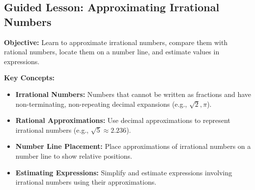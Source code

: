 \documentclass[12pt]{article}
\title{}
\date{}
\begin{document}
\subsection*{Guided Lesson: Approximating Irrational Numbers}
\onehalfspacing

\begin{tcolorbox}[colframe=black!40, colback=gray!5, 
coltitle=black, colbacktitle=black!20, fonttitle=\bfseries\Large, 
title=Learning Objective, halign title=center, left=5pt, right=5pt, top=5pt, bottom=15pt]
\textbf{Objective:} Learn to approximate irrational numbers, compare them with rational numbers, locate them on a number line, and estimate values in expressions.
\end{tcolorbox}

\begin{tcolorbox}[colframe=black!60, colback=white, 
coltitle=black, colbacktitle=black!15, fonttitle=\bfseries\Large, 
title=Key Concepts and Vocabulary, halign title=center, left=10pt, right=10pt, top=10pt, bottom=15pt]
\textbf{Key Concepts:}
\begin{itemize}
    \item \textbf{Irrational Numbers:} Numbers that cannot be written as fractions and have non-terminating, non-repeating decimal expansions (e.g., \( \sqrt{2}, \pi \)).
    \item \textbf{Rational Approximations:} Use decimal approximations to represent irrational numbers (e.g., \( \sqrt{5} \approx 2.236 \)).
    \item \textbf{Number Line Placement:} Place approximations of irrational numbers on a number line to show relative positions.
    \item \textbf{Estimating Expressions:} Simplify and estimate expressions involving irrational numbers using their approximations.
\end{itemize}
\end{tcolorbox}
\end{document}
